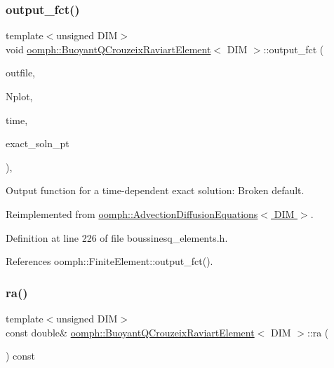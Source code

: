 \subsubsection{\texorpdfstring{output\+\_\+fct()}{output\_fct()}\hspace{0.1cm}{\footnotesize\ttfamily [2/2]}}
{\footnotesize\ttfamily template$<$unsigned D\+IM$>$ \\
void \hyperlink{classoomph_1_1BuoyantQCrouzeixRaviartElement}{oomph\+::\+Buoyant\+Q\+Crouzeix\+Raviart\+Element}$<$ D\+IM $>$\+::output\+\_\+fct (\begin{DoxyParamCaption}\item[{std\+::ostream \&}]{outfile,  }\item[{const unsigned \&}]{Nplot,  }\item[{const double \&}]{time,  }\item[{\hyperlink{classoomph_1_1FiniteElement_ad4ecf2b61b158a4b4d351a60d23c633e}{Finite\+Element\+::\+Unsteady\+Exact\+Solution\+Fct\+Pt}}]{exact\+\_\+soln\+\_\+pt }\end{DoxyParamCaption})\hspace{0.3cm}{\ttfamily [inline]}, {\ttfamily [virtual]}}



Output function for a time-\/dependent exact solution\+: Broken default. 



Reimplemented from \hyperlink{classoomph_1_1AdvectionDiffusionEquations_affb6feff30ffb8617315e555e1bb7185}{oomph\+::\+Advection\+Diffusion\+Equations$<$ D\+I\+M $>$}.



Definition at line 226 of file boussinesq\+\_\+elements.\+h.



References oomph\+::\+Finite\+Element\+::output\+\_\+fct().

\mbox{\label{classoomph_1_1BuoyantQCrouzeixRaviartElement_a5876310641d9f5028de6d4263013e247}} 
\subsubsection{\texorpdfstring{ra()}{ra()}}
{\footnotesize\ttfamily template$<$unsigned D\+IM$>$ \\
const double\& \hyperlink{classoomph_1_1BuoyantQCrouzeixRaviartElement}{oomph\+::\+Buoyant\+Q\+Crouzeix\+Raviart\+Element}$<$ D\+IM $>$\+::ra (\begin{DoxyParamCaption}{ }\end{DoxyParamCaption}) const\hspace{0.3cm}{\ttfamily [inline]}}




